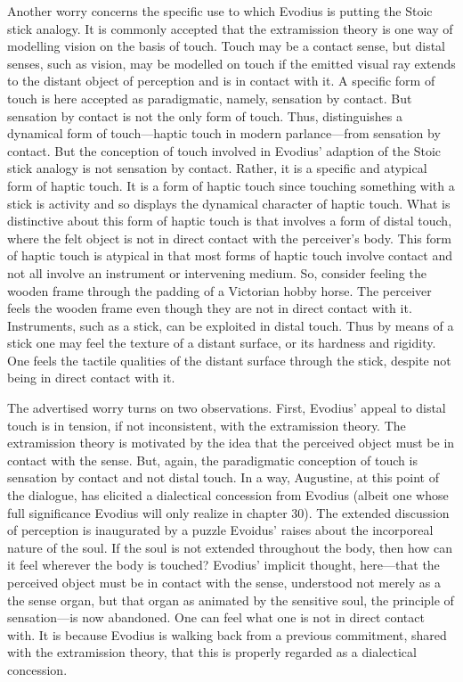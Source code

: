 \documentclass[12pt]{article}
\begin{document}
Another worry concerns the specific use to which Evodius is putting the Stoic stick analogy. It is commonly accepted that the extramission theory is one way of modelling vision on the basis of touch. Touch may be a contact sense, but distal senses, such as vision, may be modelled on touch if the emitted visual ray extends to the distant object of perception and is in contact with it. A specific form of touch is here accepted as paradigmatic, namely, sensation by contact. But sensation by contact is not the only form of touch. Thus, \citet{Broad:1952kx} distinguishes a dynamical form of touch---haptic touch in modern parlance---from sensation by contact. But the conception of touch involved in Evodius' adaption of the Stoic stick analogy is not sensation by contact. Rather, it is a specific and atypical form of haptic touch. It is a form of haptic touch since touching something with a stick is activity and so displays the dynamical character of haptic touch. What is distinctive about this form of haptic touch is that involves a form of distal touch, where the felt object is not in direct contact with the perceiver's body. This form of haptic touch is atypical in that most forms of haptic touch involve contact and not all involve an instrument or intervening medium. So, consider feeling the wooden frame through the padding of a Victorian hobby horse. The perceiver feels the wooden frame even though they are not in direct contact with it. Instruments, such as a stick, can be exploited in distal touch. Thus by means of a stick one may feel the texture of a distant surface, or its hardness and rigidity. One feels the tactile qualities of the distant surface through the stick, despite not being in direct contact with it. 

The advertised worry turns on two observations. First, Evodius' appeal to distal touch is in tension, if not inconsistent, with the extramission theory. The extramission theory is motivated by the idea that the perceived object must be in contact with the sense. But, again, the paradigmatic conception of touch is sensation by contact and not distal touch. In a way, Augustine, at this point of the dialogue, has elicited a dialectical concession from Evodius (albeit one whose full significance Evodius will only realize in chapter 30). The extended discussion of perception is inaugurated by a puzzle Evoidus' raises about the incorporeal nature of the soul. If the soul is not extended throughout the body, then how can it feel wherever the body is touched? Evodius' implicit thought, here---that the perceived object must be in contact with the sense, understood not merely as a the sense organ, but that organ as animated by the sensitive soul, the principle of sensation---is now abandoned. One can feel what one is not in direct contact with. It is because Evodius is walking back from a previous commitment, shared with the extramission theory, that this is properly regarded as a dialectical concession.
\end{document}
